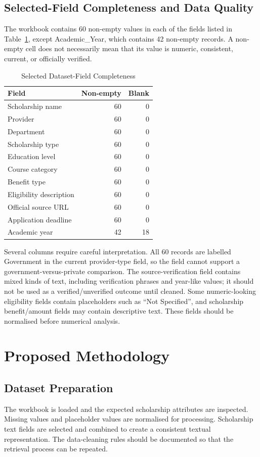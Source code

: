 \documentclass[conference]{IEEEtran}
\begin{document}
\subsection{Selected-Field Completeness and Data Quality}
The workbook contains 60 non-empty values in each of the fields listed in Table~\ref{tab:completeness}, except Academic\_Year, which contains 42 non-empty records. A non-empty cell does not necessarily mean that its value is numeric, consistent, current, or officially verified.
\begin{table}[!t]
\caption{Selected Dataset-Field Completeness}
\label{tab:completeness}
\centering
\small
\begin{tabular}{p{}rr}
\toprule
\textbf{Field} & \textbf{Non-empty} & \textbf{Blank}\\
\midrule
Scholarship name & 60 & 0\\
Provider & 60 & 0\\
Department & 60 & 0\\
Scholarship type & 60 & 0\\
Education level & 60 & 0\\
Course category & 60 & 0\\
Benefit type & 60 & 0\\
Eligibility description & 60 & 0\\
Official source URL & 60 & 0\\
Application deadline & 60 & 0\\
Academic year & 42 & 18\\
\bottomrule
\end{tabular}
\end{table}

Several columns require careful interpretation. All 60 records are labelled Government in the current provider-type field, so the field cannot support a government-versus-private comparison. The source-verification field contains mixed kinds of text, including verification phrases and year-like values; it should not be used as a verified/unverified outcome until cleaned. Some numeric-looking eligibility fields contain placeholders such as ``Not Specified'', and scholarship benefit/amount fields may contain descriptive text. These fields should be normalised before numerical analysis.

\section{Proposed Methodology}
\subsection{Dataset Preparation}
The workbook is loaded and the expected scholarship attributes are inspected. Missing values and placeholder values are normalised for processing. Scholarship text fields are selected and combined to create a consistent textual representation. The data-cleaning rules should be documented so that the retrieval process can be repeated.
\end{document}
